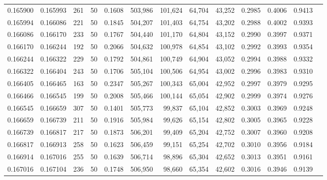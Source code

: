 \begin{tabular}{rrrrrrrrrrrrr}
0.165900 & 0.165993 &   261 &  50 &                                     0.1608 & 503,986 & 101,624 &  64,704 &  43,252 & 0.2985 & 0.4006 & 0.9413 \\
0.165994 & 0.166086 &   221 &  50 &                                     0.1845 & 504,207 & 101,403 &  64,754 &  43,202 & 0.2988 & 0.4002 & 0.9393 \\
0.166086 & 0.166170 &   233 &  50 &                                     0.1767 & 504,440 & 101,170 &  64,804 &  43,152 & 0.2990 & 0.3997 & 0.9371 \\
0.166170 & 0.166244 &   192 &  50 &                                     0.2066 & 504,632 & 100,978 &  64,854 &  43,102 & 0.2992 & 0.3993 & 0.9354 \\
0.166244 & 0.166322 &   229 &  50 &                                     0.1792 & 504,861 & 100,749 &  64,904 &  43,052 & 0.2994 & 0.3988 & 0.9332 \\
0.166322 & 0.166404 &   243 &  50 &                                     0.1706 & 505,104 & 100,506 &  64,954 &  43,002 & 0.2996 & 0.3983 & 0.9310 \\
0.166405 & 0.166465 &   163 &  50 &                                     0.2347 & 505,267 & 100,343 &  65,004 &  42,952 & 0.2997 & 0.3979 & 0.9295 \\
0.166466 & 0.166545 &   199 &  50 &                                     0.2008 & 505,466 & 100,144 &  65,054 &  42,902 & 0.2999 & 0.3974 & 0.9276 \\
0.166545 & 0.166659 &   307 &  50 &                                     0.1401 & 505,773 &  99,837 &  65,104 &  42,852 & 0.3003 & 0.3969 & 0.9248 \\
0.166659 & 0.166739 &   211 &  50 &                                     0.1916 & 505,984 &  99,626 &  65,154 &  42,802 & 0.3005 & 0.3965 & 0.9228 \\
0.166739 & 0.166817 &   217 &  50 &                                     0.1873 & 506,201 &  99,409 &  65,204 &  42,752 & 0.3007 & 0.3960 & 0.9208 \\
0.166817 & 0.166913 &   258 &  50 &                                     0.1623 & 506,459 &  99,151 &  65,254 &  42,702 & 0.3010 & 0.3956 & 0.9184 \\
0.166914 & 0.167016 &   255 &  50 &                                     0.1639 & 506,714 &  98,896 &  65,304 &  42,652 & 0.3013 & 0.3951 & 0.9161 \\
0.167016 & 0.167104 &   236 &  50 &                                     0.1748 & 506,950 &  98,660 &  65,354 &  42,602 & 0.3016 & 0.3946 & 0.9139 \\

\end{tabular}
